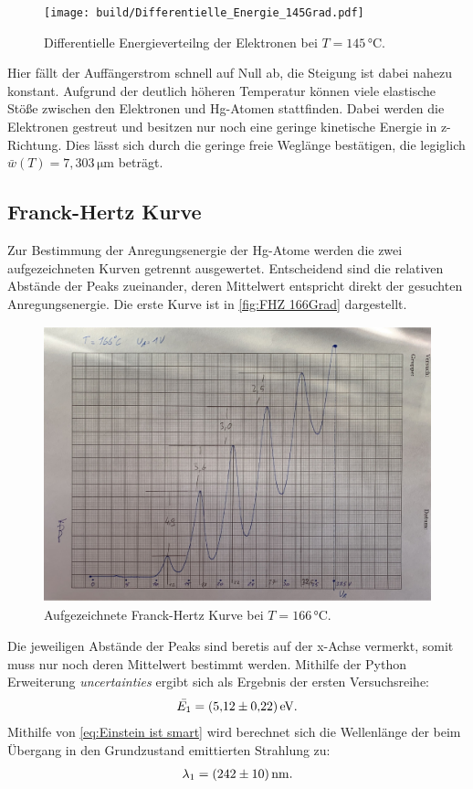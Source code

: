 \begin{figure}[H]
    \centering
    \texttt{[image: build/Differentielle\_Energie\_145Grad.pdf]}
    \caption{Differentielle Energieverteilng der Elektronen bei $T=145\,\unit{\celsius}$.}
    \label{fig:Diff Energie 145Grad}
\end{figure}

Hier fällt der Auffängerstrom schnell auf Null ab, die Steigung ist dabei nahezu konstant.
Aufgrund der deutlich höheren Temperatur können viele elastische Stöße
zwischen den Elektronen und Hg-Atomen stattfinden. Dabei werden die Elektronen gestreut und besitzen nur noch
eine geringe kinetische Energie in z-Richtung.
Dies lässt sich durch die geringe freie Weglänge bestätigen, die legiglich $\bar{w}(T) = 7,303\,\unit{\micro\meter}$ beträgt.

\subsection{Franck-Hertz Kurve}

Zur Bestimmung der Anregungsenergie der Hg-Atome werden die zwei aufgezeichneten Kurven getrennt ausgewertet.
Entscheidend sind die relativen Abstände der Peaks zueinander, deren Mittelwert entspricht direkt der
gesuchten Anregungsenergie. Die erste Kurve ist in \autoref{fig:FHZ 166Grad} dargestellt.

\begin{figure}[H]
  \centering
  \includegraphics[height=8cm]{content/data/FH_166.pdf}
  \caption{Aufgezeichnete Franck-Hertz Kurve bei $T=166\,\unit{\celsius}$.}
  \label{fig:FHZ 166Grad}
\end{figure}

Die jeweiligen Abstände der Peaks sind beretis auf der x-Achse vermerkt, somit muss nur noch deren
Mittelwert bestimmt werden. Mithilfe der Python Erweiterung \textit{uncertainties} \cite{uncertainties} 
ergibt sich als Ergebnis der ersten Versuchsreihe:
\begin{gather*}
    \bar{E_1}=\qty{5.12+-0.22}{\electronvolt}.
\end{gather*}
Mithilfe von \autoref{eq:Einstein ist smart} wird berechnet sich die Wellenlänge der beim Übergang in den
Grundzustand emittierten Strahlung zu:
\begin{gather*}
  \lambda_1=\qty{242+-10}{\nano\meter}.
\end{gather*}

